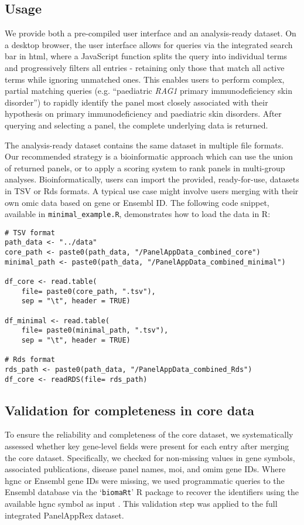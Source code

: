 \subsection{Usage}
\noindent
We provide both a pre-compiled user interface and an analysis-ready dataset.
On a desktop browser, the user interface allows for queries via the integrated search bar in \ac{html}, where a JavaScript function splits the query into individual terms and progressively filters all entries - retaining only those that match all active terms while ignoring unmatched ones. This enables users to perform complex, partial matching queries (e.g. ``paediatric \textit{RAG1} primary immunodeficiency skin disorder'') to rapidly identify the panel most closely associated with their hypothesis on primary immunodeficiency and paediatric skin disorders.
After querying and selecting a panel, the complete underlying data is returned.

The analysis-ready dataset contains the same dataset in multiple file formats.
Our recommended strategy is a bioinformatic approach which can use the union of returned panels, or to apply a scoring system to rank panels in multi-group analyses.
Bioinformatically, users can import the provided, ready-for-use, datasets in TSV or Rds formats.
A typical use case might involve users merging with their own omic data based on gene or Ensembl ID.
The following code snippet, available in \texttt{minimal\_example.R}, demonstrates how to load the data in R:
\begin{verbatim}
# TSV format
path_data <- "../data"
core_path <- paste0(path_data, "/PanelAppData_combined_core")
minimal_path <- paste0(path_data, "/PanelAppData_combined_minimal")

df_core <- read.table(
    file= paste0(core_path, ".tsv"), 
    sep = "\t", header = TRUE)

df_minimal <- read.table(
    file= paste0(minimal_path, ".tsv"), 
    sep = "\t", header = TRUE)

# Rds format
rds_path <- paste0(path_data, "/PanelAppData_combined_Rds")
df_core <- readRDS(file= rds_path)
\end{verbatim}

\subsection{Validation for completeness in core data}
\noindent
To ensure the reliability and completeness of the core dataset, we systematically assessed whether key gene-level fields were present for each entry after merging the core dataset.
Specifically, we checked for non-missing values in gene symbols, associated publications, disease panel names, \ac{moi}, and \ac{omim} gene IDs. 
Where \ac{hgnc} or Ensembl gene IDs were missing, we used programmatic queries to the Ensembl database via the `\texttt{biomaRt}' R package to recover the identifiers using the available \ac{hgnc} symbol as input \cite{steffen_durinck_biomart}. 
This validation step was applied to the full integrated PanelAppRex dataset.

